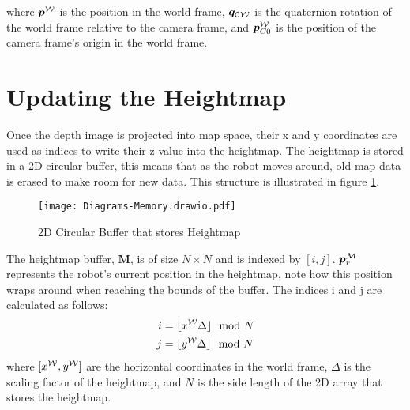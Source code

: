         \noindent
        where \(\boldsymbol{p}\inrefframe{\fworld}\) is the position in the world frame, \(\boldsymbol{q}_{\fcamera\fworld}\) is the quaternion rotation of the world frame relative to the camera frame, and \(\boldsymbol{p}\inrefframe{\fworld}_{C0}\) is the position of the camera frame's origin in the world frame.

    \newpage
    \section{Updating the Heightmap}
        Once the depth image is projected into map space, their x and y coordinates are used as indices to write their z value into the heightmap. The heightmap is stored in
        a 2D circular buffer, this means that as the robot moves around, old map data is erased to make room for new data. This structure is illustrated in figure \ref{fig:memory}.
        \begin{figure}[h]
            \centering
            \texttt{[image: Diagrams-Memory.drawio.pdf]}
            \caption{2D Circular Buffer that stores Heightmap}
            \label{fig:memory}
        \end{figure}

        \noindent
        The heightmap buffer, \(\bm{M}\), is of size \(N \times N\) and is indexed by \([i,j]\). \(\boldsymbol{p}\inrefframe{\fmap}_r\) represents the robot's current position in the heightmap, note how this position wraps around when reaching the bounds of the buffer. The indices i and j are calculated as follows:
        \begin{align} \label{eq:map_index}
            \begin{split}
                i &= \lfloor x\inrefframe{\fworld} \Delta \rfloor \mod{N} \\
                j &= \lfloor y\inrefframe{\fworld} \Delta \rfloor \mod{N}
            \end{split}
        \end{align}
        where \([x\inrefframe{\fworld}, y\inrefframe{\fworld}]\) are the horizontal coordinates in the world frame, \(\Delta\) is the scaling factor of the heightmap, and \(N\) is the side length of the 2D array that stores the heightmap.
        
    \newpage
